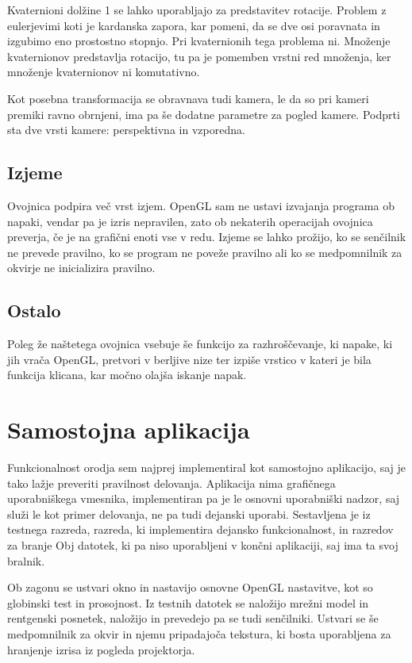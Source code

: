 \documentclass[a4paper, 12pt]{book}
\begin{document}
Kvaternioni dolžine 1 se lahko uporabljajo za predstavitev rotacije. Problem z eulerjevimi koti je kardanska zapora, kar pomeni, da se dve osi poravnata in izgubimo eno prostostno stopnjo. Pri kvaternionih tega problema ni. Množenje kvaternionov predstavlja rotacijo, tu pa je pomemben vrstni red množenja, ker množenje kvaternionov ni komutativno.

Kot posebna transformacija se obravnava tudi kamera, le da so pri kameri premiki ravno obrnjeni, ima pa še dodatne parametre za pogled kamere. Podprti sta dve vrsti kamere: perspektivna in vzporedna.


\subsection{Izjeme}
Ovojnica podpira več vrst izjem. OpenGL sam ne ustavi izvajanja programa ob napaki, vendar pa je izris nepravilen, zato ob nekaterih operacijah ovojnica preverja, če je na grafični enoti vse v redu. Izjeme se lahko prožijo, ko se senčilnik ne prevede pravilno, ko se program ne poveže pravilno ali ko se medpomnilnik za okvirje ne inicializira pravilno.

\subsection{Ostalo}

Poleg že naštetega ovojnica vsebuje še funkcijo za razhroščevanje, ki napake, ki jih vrača OpenGL, pretvori v berljive nize ter izpiše vrstico v kateri je bila funkcija klicana, kar močno olajša iskanje napak.

\section{Samostojna aplikacija}

Funkcionalnost orodja sem najprej implementiral kot samostojno aplikacijo, saj je tako lažje preveriti pravilnost delovanja. Aplikacija nima grafičnega uporabniškega vmesnika, implementiran pa je le osnovni uporabniški nadzor, saj služi le kot primer delovanja, ne pa tudi dejanski uporabi. Sestavljena je iz testnega razreda, razreda, ki implementira dejansko funkcionalnost, in razredov za branje Obj datotek, ki pa niso uporabljeni v končni aplikaciji, saj ima ta svoj bralnik. 

Ob zagonu se ustvari okno in nastavijo osnovne OpenGL nastavitve, kot so globinski test in prosojnost. Iz testnih datotek se naložijo mrežni model in rentgenski posnetek, naložijo in prevedejo pa se tudi senčilniki. Ustvari se še medpomnilnik za okvir in njemu pripadajoča tekstura, ki bosta uporabljena za hranjenje izrisa iz pogleda projektorja.
\end{document}
